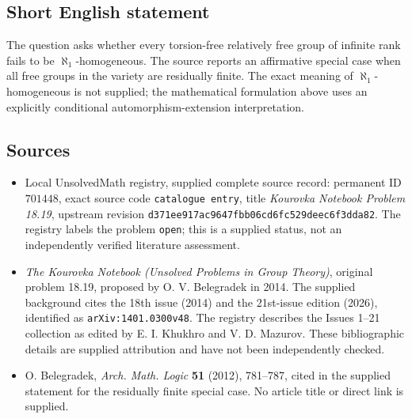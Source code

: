 \documentclass[11pt]{article}
\begin{document}
\subsection{Short English statement}
The question asks whether every torsion-free relatively free group of infinite rank fails to be \(\aleph_1\)-homogeneous. The source reports an affirmative special case when all free groups in the variety are residually finite. The exact meaning of \(\aleph_1\)-homogeneous is not supplied; the mathematical formulation above uses an explicitly conditional automorphism-extension interpretation.
\subsection{Sources}
\begin{itemize}
\item Local UnsolvedMath registry, supplied complete source record: permanent ID \(701448\), exact source code \texttt{catalogue entry}, title \emph{Kourovka Notebook Problem 18.19}, upstream revision \texttt{d371ee917ac9647fbb06cd6fc529deec6f3dda82}. The registry labels the problem \texttt{open}; this is a supplied status, not an independently verified literature assessment.
\item \emph{The Kourovka Notebook (Unsolved Problems in Group Theory)}, original problem 18.19, proposed by O. V. Belegradek in 2014. The supplied background cites the 18th issue (2014) and the 21st-issue edition (2026), identified as \texttt{arXiv:1401.0300v48}. The registry describes the Issues 1--21 collection as edited by E. I. Khukhro and V. D. Mazurov. These bibliographic details are supplied attribution and have not been independently checked.
\item O. Belegradek, \emph{Arch. Math. Logic} \textbf{51} (2012), 781--787, cited in the supplied statement for the residually finite special case. No article title or direct link is supplied.
\end{itemize}
\end{document}
